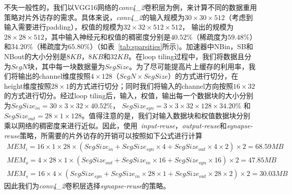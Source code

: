 不失一般性的，我们以VGG16网络的\emph{conv4\_2}卷积层为例，来计算不同的数据重用策略对片外访存的需求。具体来说，\emph{conv4\_2}的输入规模为$30\times 30\times 512$（考虑到输入需要进行padding），权值的规模为$32\times 32\times 512\times 512$， 输出的规模为$28\times 28\times 512$，其中输入神经元和权值的稠密度分别是$40.52\%$（稀疏度为$59.48\%$）和$34.20\%$（稀疏度为$65.80\%$）（如表~\ref{tab:sparsities}所示)。加速器中NBin，SB和NBout的大小分别是$8KB$，$8KB$和$32KB$。在loop tiling过程中，我们将数据且分为$SegN$块，其中每一块数据量为$SegSize$。为了尽可能提高片上缓存的利用率，我们将输出的channel维度按照$4\times 128$（$SegN\times SegSize$）的方式进行切分，在height维度按照$28\times 1$的方式进行切分；同时我们将输入的channel方向按照$16\times 32$的方式进行切分。经过loop tiling后，输入，权值，输出每一个数据块的大小分别为$SegSize_{in} = 30\times 3\times 32\times 40.52\%$， $SegSize_{syn} = 3\times 3\times 32\times 128\times 34.20\%$ 和 $SegSize_{out} = 28\times 1\times 128$。值得注意的是，我们对输入数据块和权值数据块分别乘以网络的稠密度来进行近似。因此，使用~\emph{input-reuse}，\emph{output-reuse}和\emph{synapse-reuse}策略，所需要的片外访存的开销可以按照如下公式进行计算
\begin{gather*}
MEM_{i} = 16 \times 1 \times 28 \times (SegSize_{in} + SegSize_{syn} \times 4 + SegSize_{out} \times 4 \times 2)\times 2 = 68.59MB \\
MEM_{o} = 4 \times 28 \times 1 \times (SegSize_{out} + SegSize_{in} \times 16 + SegSize_{syn} \times 16)\times 2 = 47.85MB \\
MEM_{s} = 16 \times 4 \times (SegSize_{syn} + SegSize_{in} \times 28 \times 1 + SegSize_{out} \times 28 \times 2)\times 2 = 30.03MB 
\end{gather*}
因此我们为\emph{conv4\_2}卷积层选择\emph{synapse-reuse}的策略。



